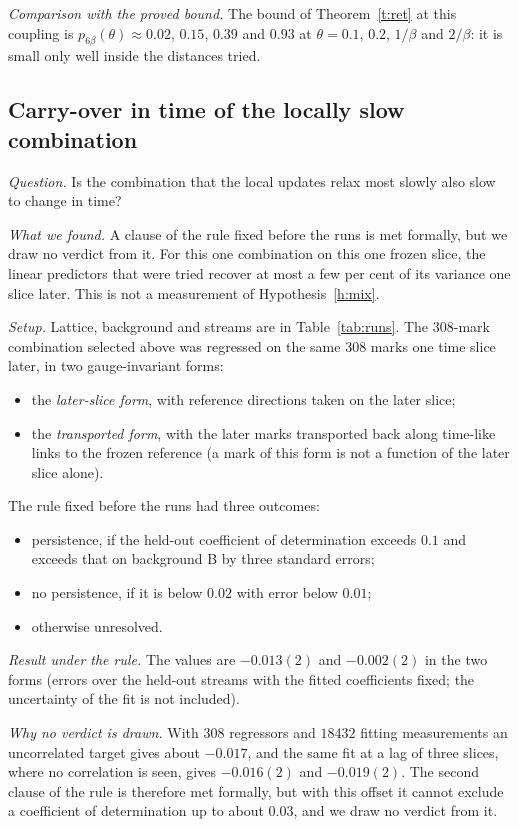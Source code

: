 \emph{Comparison with the proved bound.} The bound of Theorem~\ref{t:ret} at this coupling is
$p_{6\beta}(\theta)\approx0.02$, $0.15$, $0.39$ and $0.93$ at $\theta=0.1$, $0.2$, $1/\beta$ and $2/\beta$: it
is small only well inside the distances tried.

\subsection{Carry-over in time of the locally slow combination}\label{s:time}
\emph{Question.} Is the combination that the local updates relax most slowly also slow to change in time?

\emph{What we found.} A clause of the rule fixed before the runs is met formally, but we draw no verdict
from it. For
this one combination on this one frozen slice, the linear predictors that were tried recover at most a few
per cent of its variance one slice later. This is not a measurement of Hypothesis~\ref{h:mix}.

\emph{Setup.} Lattice, background and streams are in Table~\ref{tab:runs}. The $308$-mark combination
selected above was regressed on the same $308$ marks one time slice later, in two gauge-invariant forms:
\begin{itemize}
\item the \emph{later-slice form}, with reference directions taken on the later slice;
\item the \emph{transported form}, with the later marks transported back along time-like links to the frozen
reference (a mark of this form is not a function of the later slice alone).
\end{itemize}
The rule fixed before the runs had three outcomes:
\begin{itemize}
\item persistence, if the held-out coefficient of determination exceeds $0.1$ and exceeds that on
background B by three standard errors;
\item no persistence, if it is below $0.02$ with error below $0.01$;
\item otherwise unresolved.
\end{itemize}

\emph{Result under the rule.} The values are $-0.013(2)$ and $-0.002(2)$ in the two forms (errors over the
held-out streams with the fitted coefficients fixed; the uncertainty of the fit is not included).

\emph{Why no verdict is drawn.} With $308$ regressors and $18432$ fitting measurements an uncorrelated target
gives about $-0.017$, and the same fit at a lag of three slices, where no correlation is seen, gives
$-0.016(2)$ and $-0.019(2)$. The second clause of the rule is therefore met formally, but with this offset it
cannot exclude a coefficient of determination up to about $0.03$, and we draw no verdict from it.

